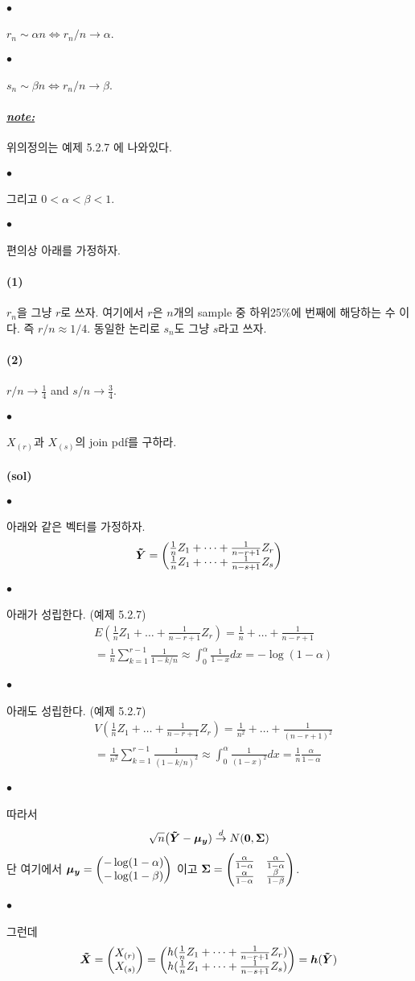 \documentclass[12pt,oneside,english]{book}
\def\ck{\paragraph{\Large$\bullet$}\Large}
\def\sol{\paragraph{\Large(sol)}\Large}
\def\note{\paragraph{\Large\textit{\underline{note:}}}\Large}
\def\one{\paragraph{\Large(1)}\Large}
\def\two{\paragraph{\Large(2)}\Large}
\newcommand{\bs}[1]{\mbox{\boldmath $#1$}}
\begin{document}
\ck $r_n \sim \alpha n \Longleftrightarrow r_n/n \to \alpha$. 
\ck $s_n \sim \beta n \Longleftrightarrow r_n/n \to \beta$. 
\note 위의정의는 예제 5.2.7 에 나와있다. 
\ck 그리고 $0<\alpha<\beta<1$. 
\ck 편의상 아래를 가정하자. 
\one $r_n$을 그냥 $r$로 쓰자. 여기에서 $r$은 $n$개의 sample 중 하위25\%에 번째에 해당하는 수 이다. 즉 $r/n \approx 1/4$. 동일한 논리로 $s_n$도 그냥 $s$라고 쓰자. 
\two $r/n \to \frac{1}{4}$ and $s/n \to \frac{3}{4}$. 

\ck $X_{(r)}$과 $X_{(s)}$의 join pdf를 구하라. 

\sol 
\ck 아래와 같은 벡터를 가정하자. 
\[
\bs{\tilde{Y}}=\begin{pmatrix} \frac{1}{n}Z_1+\dots+\frac{1}{n-r+1}Z_r \\  \frac{1}{n}Z_1+\dots+\frac{1}{n-s+1}Z_s \end{pmatrix}
\]

\ck 아래가 성립한다. (예제 5.2.7)
\begin{align*}
& E\left(\frac{1}{n}Z_1+\dots+\frac{1}{n-r+1}Z_r\right)=
\frac{1}{n}+\dots+\frac{1}{n-r+1} \\ 
& =\frac{1}{n} \sum_{k=1}^{r-1}\frac{1}{1-k/n} \approx \int_0^{\alpha}\frac{1}{1-x}dx=-\log(1-\alpha)
\end{align*}

\ck 아래도 성립한다. (예제 5.2.7)
\begin{align*}
& V\left(\frac{1}{n}Z_1+\dots+\frac{1}{n-r+1}Z_r\right)=
\frac{1}{n^2}+\dots+\frac{1}{(n-r+1)^2} \\ 
& =\frac{1}{n^2} \sum_{k=1}^{r-1}\frac{1}{(1-k/n)^2} \approx \int_0^{\alpha}\frac{1}{(1-x)^2}dx=\frac{1}{n}\frac{\alpha}{1-\alpha}
\end{align*}

\ck 따라서 
\[
\sqrt{n}\big(\bs{\tilde Y}-\bs{\mu_y})\overset{d}{\to} N({\bs 0},{\bs \Sigma})
\]
단 여기에서 $\bs{\mu_y}=\begin{pmatrix} -\log(1-\alpha) \\ -\log(1-\beta) \end{pmatrix}$ 이고 ${\bs \Sigma}=\begin{pmatrix}\frac{\alpha}{1-\alpha} & \frac{\alpha}{1-\alpha} \\ \frac{\alpha}{1-\alpha} & \frac{\beta}{1-\beta} \end{pmatrix}$. 

\ck 그런데 
\[
\bs{\tilde{X}}=\begin{pmatrix} X_{(r)}\\ X_{(s)} \end{pmatrix}=\begin{pmatrix} h(\frac{1}{n}Z_1+\dots+\frac{1}{n-r+1}Z_r) \\  h(\frac{1}{n}Z_1+\dots+\frac{1}{n-s+1}Z_s) \end{pmatrix}={\bs h}(\bs{\tilde Y})
\]
\end{document}
